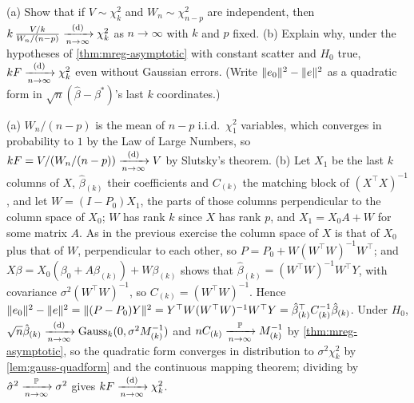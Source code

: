\begin{exercise}
\label{ex:mreg-f-chisq}
(a) Show that if $V \sim \chi^2_k$ and $W_n \sim \chi^2_{n-p}$ are independent, then $k\,\frac{V/k}{W_n/(n - p)} \xrightarrow [n \to \infty ]{\text{(d)}} \chi^2_k$ as $n \to \infty$ with $k$ and $p$ fixed. (b) Explain why, under the hypotheses of \cref{thm:mreg-asymptotic} with constant scatter and $H_0$ true, $kF \xrightarrow [n \to \infty ]{\text{(d)}} \chi^2_k$ even without Gaussian errors. (Write $\lVert e_0\rVert^2 - \lVert e\rVert^2$ as a quadratic form in $\sqrt{n}(\hat{\beta} - \beta^*)$'s last $k$ coordinates.)
\end{exercise}
\begin{solution}
(a) $W_n/(n - p)$ is the mean of $n - p$ i.i.d.\ $\chi^2_1$ variables, which converges in probability to $1$ by the Law of Large Numbers, so $kF = V/(W_n/(n - p)) \xrightarrow [n \to \infty ]{\text{(d)}} V$ by Slutsky's theorem. (b) Let $X_1$ be the last $k$ columns of $X$, $\hat{\beta}_{(k)}$ their coefficients and $C_{(k)}$ the matching block of $(X^\top X)^{-1}$, and let $W = (I - P_0)X_1$, the parts of those columns perpendicular to the column space of $X_0$; $W$ has rank $k$ since $X$ has rank $p$, and $X_1 = X_0A + W$ for some matrix $A$. As in the previous exercise the column space of $X$ is that of $X_0$ plus that of $W$, perpendicular to each other, so $P = P_0 + W(W^\top W)^{-1}W^\top$; and $X\beta = X_0(\beta_0 + A\beta_{(k)}) + W\beta_{(k)}$ shows that $\hat{\beta}_{(k)} = (W^\top W)^{-1}W^\top Y$, with covariance $\sigma^2(W^\top W)^{-1}$, so $C_{(k)} = (W^\top W)^{-1}$. Hence $\lVert e_0\rVert^2 - \lVert e\rVert^2 = \lVert(P - P_0)Y\rVert^2 = Y^\top W(W^\top W)^{-1}W^\top Y = \hat{\beta}_{(k)}^\top C_{(k)}^{-1}\hat{\beta}_{(k)}$. Under $H_0$, $\sqrt{n}\hat{\beta}_{(k)} \xrightarrow [n \to \infty ]{\text{(d)}} \text{Gauss}_k(0, \sigma^2 M^{-1}_{(k)})$ and $nC_{(k)} \xrightarrow [n \to \infty ]{\mathbb{P}} M^{-1}_{(k)}$ by \cref{thm:mreg-asymptotic}, so the quadratic form converges in distribution to $\sigma^2\chi^2_k$ by \cref{lem:gauss-quadform} and the continuous mapping theorem; dividing by $\hat{\sigma}^2 \xrightarrow [n \to \infty ]{\mathbb{P}} \sigma^2$ gives $kF \xrightarrow [n \to \infty ]{\text{(d)}} \chi^2_k$.
\end{solution}

